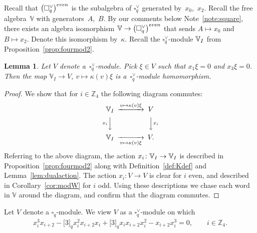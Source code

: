 \documentclass[11pt]{article}
\numberwithin{equation}{section}
\numberwithin{equation}{section}
\newtheorem{Lemma}[Theorem]{Lemma}
\begin{document}
{Recall that $\big(\square^\vee_q\big)^{\rm even}$ is the subalgebra of $\square^\vee_q$ generated by~$x_0$,~$x_2$. Recall the free algebra~$\mathbb V$ with generators~$A$,~$B$. By our comments below Note~\ref{note:square}, there exists an algebra isomorphism $\mathbb V\to \big(\square^\vee_q\big)^{\rm even}$ that sends $A \mapsto x_0$ and $B \mapsto x_2$. Denote this isomorphism by~$\kappa $. Recall the $\square^\vee_q $-module $\mathbb V_{\rm I}$ from Proposition~\ref{prop:fourmod2}. \begin{Lemma}\label{lem:Weta} Let $V$ denote a~$\square^\vee_q$-module. Pick $\xi \in V$ such that $x_1 \xi = 0$ and $x_3 \xi = 0$. Then the map $\mathbb V_I \to V$, $v \mapsto \kappa (v) \xi$ is a~$\square^\vee_q$-module homomorphism.
\end{Lemma}
\begin{proof} We show that for $i \in {\mathbb Z}_4 $ the following diagram commutes:
\begin{gather*}
\begin{CD}
\mathbb V_{\rm I} @>v \mapsto \kappa(v)\xi >>
 V
	 \\
 @Vx_i VV @VVx_i V \\
 \mathbb V_{\rm I} @>>v \mapsto \kappa(v) \xi> V.
 \end{CD}
\end{gather*}
Referring to the above diagram, the action $x_i\colon \mathbb V_{\rm I} \to\mathbb V_{\rm I}$
is described in Proposition~\ref{prop:fourmod2} along with Definition~\ref{def:Kdef} and Lemma~\ref{lem:dualaction}. The action $x_i\colon V\to V$ is clear for $i$ even, and described in
Corollary~\ref{cor:modW} for $i$ odd. Using these descriptions we chase each word in $\mathbb V$ around the diagram, and confirm that the diagram commutes.
\end{proof}

Let $V$ denote a $\square_q$-module. We view $V$ as a $\square^\vee_q$-module on which
\begin{gather*}
 x^3_i x_{i+2} - \lbrack 3 \rbrack_q x^2_i x_{i+2} x_i + \lbrack 3 \rbrack_q x_i x_{i+2} x^2_i -x_{i+2} x^3_i = 0, \qquad i \in \mathbb Z_4.
\end{gather*}

}
\end{document}
